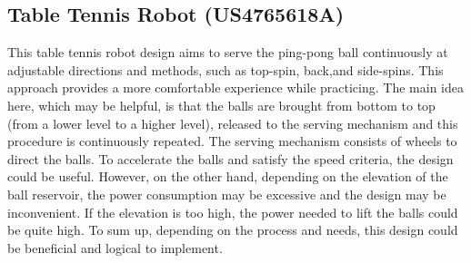 \documentclass[12pt]{report}
\begin{document}
\subsection{Table Tennis Robot (US4765618A) \cite{Daley1988}}

\begin{minipage}{0.6\textwidth}  %
    This table tennis robot design aims to serve the ping-pong ball continuously at adjustable directions and methods, such as top-spin, back,and side-spins. This approach provides a more comfortable experience while practicing. The main idea here, which may be helpful, is that the balls are brought from bottom to top (from a lower level to a higher level), released to the serving mechanism and this procedure is continuously repeated. The serving mechanism consists of wheels to direct the balls. To accelerate the balls and satisfy the speed criteria, the design could be useful. However, on the other hand, depending on the elevation of the ball reservoir, the power consumption may be excessive and the design may be inconvenient. If the elevation is too high, the power needed to lift the balls could be quite high. To sum up, depending on the process and needs, this design could be beneficial and logical to implement.
\end{minipage}%
\hfill
\end{document}
